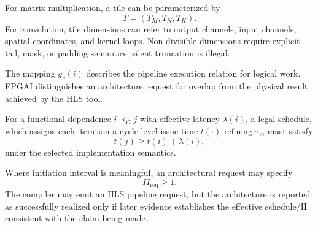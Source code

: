 \documentclass{article}
\begin{document}
For matrix multiplication, a tile can be parameterized by
\begin{equation}
T=(T_M,T_N,T_K).
\end{equation}
For convolution, tile dimensions can refer to output channels, input channels, spatial coordinates, and kernel loops. Non-divisible dimensions require explicit tail, mask, or padding semantics; silent truncation is illegal.


The mapping $g_v(i)$ describes the pipeline execution relation for logical work. FPGAI distinguishes an architecture request for overlap from the physical result achieved by the HLS tool.

For a functional dependence $i\prec_G j$ with effective latency $\lambda(i)$, a legal schedule, which assigns each iteration a cycle-level issue time $t(\cdot)$ refining $\tau_v$, must satisfy
\begin{equation}
t(j)\ge t(i)+\lambda(i),
\label{eq:dependency-preservation}
\end{equation}
under the selected implementation semantics.

Where initiation interval is meaningful, an architectural request may specify
\begin{equation}
II_{\mathrm{req}}\ge 1.
\end{equation}
The compiler may emit an HLS pipeline request, but the architecture is reported as successfully realized only if later evidence establishes the effective schedule/II consistent with the claim being made.
\end{document}
